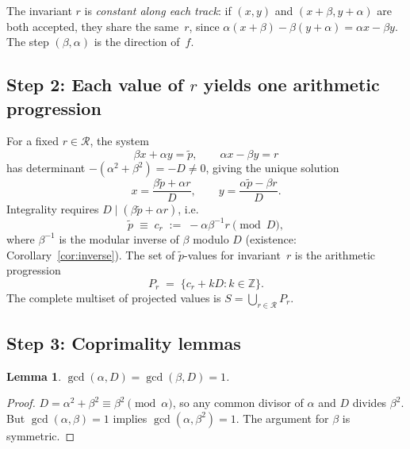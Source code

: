 \documentclass[11pt]{article}
\theoremstyle{plain}
\newtheorem{lemma}[theorem]{Lemma}
\theoremstyle{definition}
\theoremstyle{remark}
\begin{document}
The invariant $r$ is \emph{constant along each track}: if $(x, y)$ and
$(x + \beta, y + \alpha)$ are both accepted, they share the same~$r$, since
$\alpha(x+\beta) - \beta(y+\alpha) = \alpha x - \beta y$.
The step $(\beta, \alpha)$ is the direction of~$f$.

\subsection{Step 2: Each value of $r$ yields one arithmetic progression}
\label{subsec:step2}

For a fixed $r \in \mathcal{R}$, the system
\begin{equation}\label{eq:system}
    \beta x + \alpha y = \tilde{p}, \qquad
    \alpha x - \beta y = r
\end{equation}
has determinant $-(\alpha^2+\beta^2) = -D \ne 0$, giving the unique solution
\begin{equation}\label{eq:solution}
    x = \frac{\beta\tilde{p} + \alpha r}{D}, \qquad
    y = \frac{\alpha\tilde{p} - \beta r}{D}.
\end{equation}
Integrality requires $D \mid (\beta\tilde{p} + \alpha r)$, i.e.\
\begin{equation}\label{eq:residue}
    \tilde{p} \;\equiv\; c_r \;:=\; -\alpha\beta^{-1}r \pmod{D},
\end{equation}
where $\beta^{-1}$ is the modular inverse of $\beta$ modulo $D$
(existence: Corollary~\ref{cor:inverse}).
The set of $\tilde{p}$-values for invariant~$r$ is the arithmetic progression
\begin{equation}\label{eq:Pr}
    P_r \;=\; \{c_r + kD : k \in \mathbb{Z}\}.
\end{equation}
The complete multiset of projected values is
$S = \bigcup_{r \in \mathcal{R}} P_r$.

\subsection{Step 3: Coprimality lemmas}\label{subsec:step3}

\begin{lemma}\label{lem:gcd}
$\gcd(\alpha, D) = \gcd(\beta, D) = 1$.
\end{lemma}
\begin{proof}
$D = \alpha^2 + \beta^2 \equiv \beta^2 \pmod{\alpha}$, so any common
divisor of $\alpha$ and $D$ divides $\beta^2$.  But
$\gcd(\alpha,\beta)=1$ implies $\gcd(\alpha,\beta^2)=1$.
The argument for $\beta$ is symmetric.
\end{proof}
\end{document}
